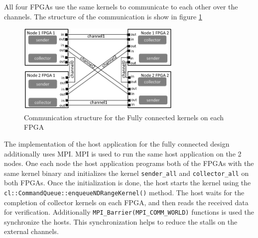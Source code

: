 All four FPGAs use the same kernels to communicate to each other over the channels.
The structure of the communication is show in figure \ref{fig:fc_struc}

\begin{figure}[h]%
    \centering
    \includegraphics[width=0.7\textwidth]{images/fc_struc}
    \caption{Communication structure for the Fully connected kernels on each FPGA}
    \label{fig:fc_struc}
\end{figure}

The implementation of the host application for the fully connected design additionally
uses MPI. MPI is used to run the same host application on the 2 nodes. One each node
the host application programs both of the FPGAs with the same kernel binary and initializes
the kernel \texttt{sender\_all} and \texttt{collector\_all} on both FPGAs. Once the initialization
is done, the host starts the kernel using the \texttt{cl::CommandQueue::enqueueNDRangeKernel()}
method. The host waits for the completion of collector kernels on each FPGA, and then reads
the received data for verification. Additionally \texttt{MPI\_Barrier(MPI\_COMM\_WORLD)} functions
is used the synchronize the hosts. This synchronization helps to reduce the stalls
on the external channels.




